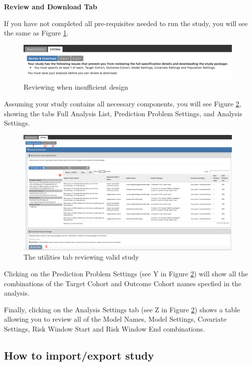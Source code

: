 \documentclass[11pt]{book}
\begin{document}
\textbf{Review and Download Tab}

If you have not completed all pre-requisites needed to run the study,
you will see the same as Figure \ref{fig:insuf}.

\begin{figure}
\includegraphics[width=1\linewidth]{images/PatientLevelPrediction/atlasImplementation/utilities_review_insuf} \caption{Reviewing when insufficient design}\label{fig:insuf}
\end{figure}

Assuming your study contains all necessary components, you will see
Figure \ref{fig:utilities}, showing the tabs Full Analysis List,
Prediction Problem Settings, and Analysis Settings.

\begin{figure}
\includegraphics[width=1\linewidth]{images/PatientLevelPrediction/atlasImplementation/utilities_p1} \caption{The utilities tab reviewing valid study}\label{fig:utilities}
\end{figure}

Clicking on the Prediction Problem Settings (see Y in Figure
\ref{fig:utilities}) will show all the combinations of the Target Cohort
and Outcome Cohort names specfied in the analysis.

Finally, clicking on the Analysis Settings tab (see Z in Figure
\ref{fig:utilities}) shows a table allowing you to review all of the
Model Names, Model Settings, Covariate Settings, Risk Window Start and
Risk Window End combinations.

\subsection{How to import/export study}\label{how-to-importexport-study}
\end{document}
